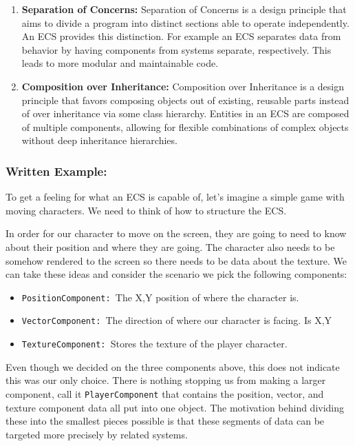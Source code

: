 \begin{enumerate}
    \item \textbf{Separation of Concerns:} Separation of Concerns is a design principle that aims to divide a program into distinct sections able to operate independently. An ECS provides this distinction. For example an ECS separates data from behavior by having components from systems separate, respectively. This leads to more modular and maintainable code.
    \item \textbf{Composition over Inheritance: }Composition over Inheritance is a design principle that favors composing objects out of existing, reusable parts instead of over inheritance via some class hierarchy. Entities in an ECS are composed of multiple components, allowing for flexible combinations of complex objects without deep inheritance hierarchies. 
\end{enumerate}

\subsubsection{Written Example:}
To get a feeling for what an ECS is capable of, let's imagine a simple game with moving characters. We need to think of how to structure the ECS. 

In order for our character to move on the screen, they are going to need to know about their position and where they are going. The character also needs to be somehow rendered to the screen so there needs to be data about the texture. We can take these ideas and consider the scenario we pick the following components:

\begin{itemize}
    \item \texttt{PositionComponent: }The X,Y position of where the character is.
    \item \texttt{VectorComponent: }The direction of where our character is facing. Is X,Y
    \item \texttt{TextureComponent: }Stores the texture of the player character.
\end{itemize}

Even though we decided on the three components above, this does not indicate this was our only choice. There is nothing stopping us from making a larger component, call it \texttt{PlayerComponent} that contains the position, vector, and texture component data all put into one object. The motivation behind dividing these into the smallest pieces possible is that these segments of data can be targeted more precisely by related systems. 

